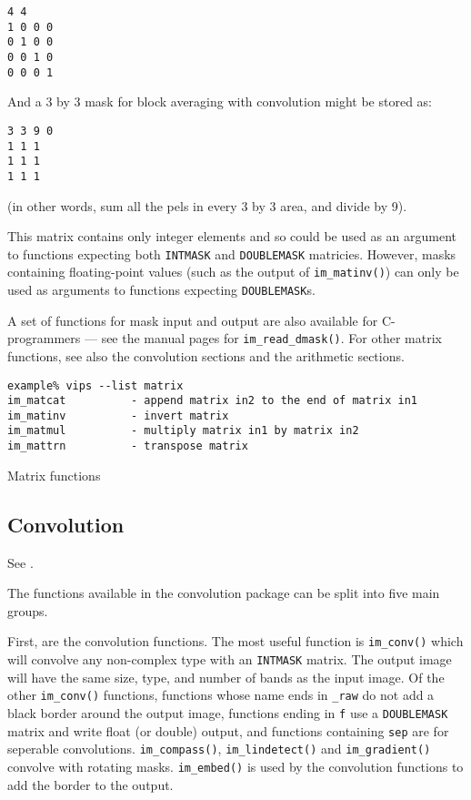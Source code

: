 \begin{verbatim}
4 4 
1 0 0 0
0 1 0 0 
0 0 1 0
0 0 0 1
\end{verbatim}
  
And a 3 by 3 mask for block averaging with convolution might be stored as:

\begin{verbatim}
3 3 9 0
1 1 1
1 1 1 
1 1 1
\end{verbatim}
  
\noindent
(in other words, sum all the pels in every 3 by 3 area, and divide by 9).

This matrix contains only integer elements and so could be used as an
argument to functions expecting both \verb+INTMASK+ and \verb+DOUBLEMASK+
matricies. However, masks containing floating-point values (such as the
output of \verb+im_matinv()+) can only be used as arguments to functions
expecting \verb+DOUBLEMASK+s.

A set of functions for mask input and output are also available for
C-programmers --- see the manual pages for \verb+im_read_dmask()+. For
other matrix functions, see also the convolution sections and the arithmetic
sections.

\begin{fig2}
\begin{verbatim}
example% vips --list matrix
im_matcat          - append matrix in2 to the end of matrix in1
im_matinv          - invert matrix
im_matmul          - multiply matrix in1 by matrix in2
im_mattrn          - transpose matrix
\end{verbatim}
\caption{Matrix functions}
\label{fg:matricies}
\end{fig2}

\subsection{Convolution}

See .

The functions available in the convolution package can be split into five
main groups.

First, are the convolution functions. The most useful function is
\verb+im_conv()+ which will convolve any non-complex type with an
\verb+INTMASK+ matrix. The output image will have the same size, type, and
number of bands as the input image. Of the other \verb+im_conv()+ functions,
functions whose name ends in \verb+_raw+ do not add a black border around the
output image, functions ending in \verb+f+ use a \verb+DOUBLEMASK+ matrix
and write float (or double) output, and functions containing \verb+sep+
are for seperable convolutions.  \verb+im_compass()+, \verb+im_lindetect()+
and \verb+im_gradient()+ convolve with rotating masks.  \verb+im_embed()+
is used by the convolution functions to add the border to the output.

